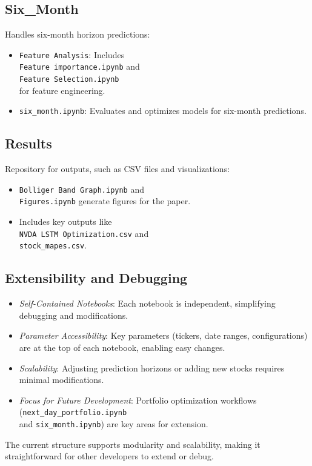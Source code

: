 \documentclass[10pt,twocolumn]{article}
\begin{document}
\subsection{Six\_Month}
Handles six-month horizon predictions:
\begin{itemize}
    \item \texttt{Feature Analysis}: Includes \\ \texttt{Feature importance.ipynb} and \\ \texttt{Feature Selection.ipynb} \\ for feature engineering.
    \item \texttt{six\_month.ipynb}: Evaluates and optimizes models for six-month predictions.
\end{itemize}

\subsection{Results}
Repository for outputs, such as CSV files and visualizations:
\begin{itemize}
    \item \texttt{Bolliger Band Graph.ipynb} and \\ \texttt{Figures.ipynb} generate figures for the paper.
    \item Includes key outputs like \\ \texttt{NVDA LSTM Optimization.csv} and \\ \texttt{stock\_mapes.csv}.
\end{itemize}

\subsection{Extensibility and Debugging}
\begin{itemize}
    \item \textit{Self-Contained Notebooks}: Each notebook is independent, simplifying debugging and modifications.
    \item \textit{Parameter Accessibility}: Key parameters (tickers, date ranges, configurations) are at the top of each notebook, enabling easy changes.
    \item \textit{Scalability}: Adjusting prediction horizons or adding new stocks requires minimal modifications.
    \item \textit{Focus for Future Development}: Portfolio optimization workflows (\texttt{next\_day\_portfolio.ipynb} \\  and \texttt{six\_month.ipynb}) are key areas for extension.
\end{itemize}

The current structure supports modularity and scalability, making it straightforward for other developers to extend or debug.

\printbibliography
\end{document}
